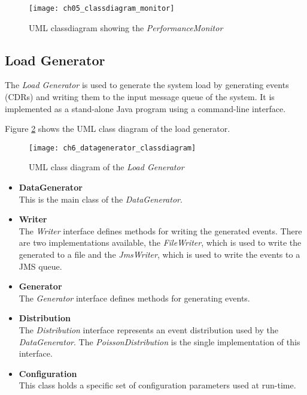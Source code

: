 \begin{figure}[htbp]
	\centering
	\texttt{[image: ch05\_classdiagram\_monitor]}
	\caption{\ac{UML} classdiagram showing the \emph{PerformanceMonitor}}
	\label{fig:ch05_classdiagram_monitor}
\end{figure}

\subsection{Load Generator}

The \emph{Load Generator} is used to generate the system load by generating events (\acp{CDR}) and writing them to the input message queue of the system. It is implemented as a stand-alone Java program using a command-line interface.

Figure \ref{fig:ch5_datagenerator_classdiagram} shows the \ac{UML} class diagram of the load generator.

\begin{figure}[htpb]
	\centering
	\texttt{[image: ch6\_datagenerator\_classdiagram]}
	\caption{\ac{UML} class diagram of the \emph{Load Generator}}
	\label{fig:ch5_datagenerator_classdiagram}
\end{figure}

\begin{itemize}
	\item \textbf{DataGenerator}\\
	This is the main class of the \emph{DataGenerator}.
	\item \textbf{Writer}\\
	The \emph{Writer} interface defines methods for writing the generated events. There are two implementations available, the \emph{FileWriter}, which is used to write the generated to a file and the \emph{JmsWriter}, which is used to write the events to a \ac{JMS} queue.
	\item \textbf{Generator}\\
	The \emph{Generator} interface defines methods for generating events.  
	\item \textbf{Distribution}\\
	The \emph{Distribution} interface represents an event distribution used by the \emph{DataGenerator}. The \emph{PoissonDistribution} is the single implementation of this interface.
	\item \textbf{Configuration}\\
	This class holds a specific set of configuration parameters used at run-time.
\end{itemize}

